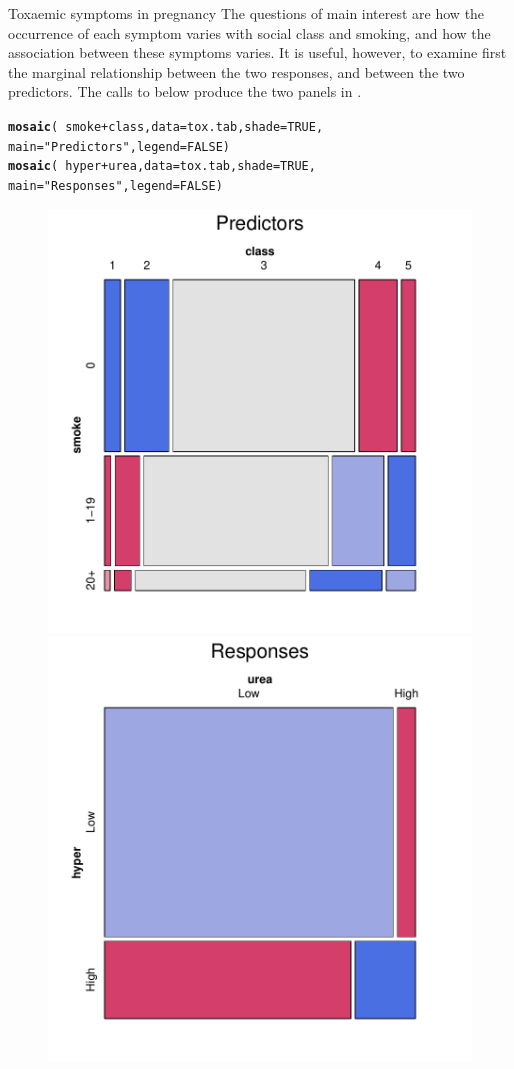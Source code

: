 \documentclass[11pt]{book}\usepackage[]{graphicx}\usepackage[]{color}
\makeatletter
\newcommand{\hlnum}[1]{\textcolor[rgb]{0.686,0.059,0.569}{#1}}%
\newcommand{\hlstr}[1]{\textcolor[rgb]{0.192,0.494,0.8}{#1}}%
\newcommand{\hlopt}[1]{\textcolor[rgb]{0,0,0}{#1}}%
\newcommand{\hlstd}[1]{\textcolor[rgb]{0.345,0.345,0.345}{#1}}%
\newcommand{\hlkwc}[1]{\textcolor[rgb]{0.333,0.667,0.333}{#1}}%
\newcommand{\hlkwd}[1]{\textcolor[rgb]{0.737,0.353,0.396}{\textbf{#1}}}%
\newenvironment{kframe}{%
 \def\at@end@of@kframe{}%
 \ifinner\ifhmode%
  \def\at@end@of@kframe{\end{minipage}}%
  \begin{minipage}{\columnwidth}%
 \fi\fi%
 \def\FrameCommand##1{\hskip\@totalleftmargin \hskip-\fboxsep
 \colorbox{shadecolor}{##1}\hskip-\fboxsep
     \hskip-\linewidth \hskip-\@totalleftmargin \hskip\columnwidth}%
 \MakeFramed {\advance\hsize-\width
   \@totalleftmargin\z@ \linewidth\hsize
   \@setminipage}}%
 {\par\unskip\endMakeFramed%
 \at@end@of@kframe}
\newenvironment{knitrout}{}{} %
\renewenvironment{knitrout}{\small\renewcommand{\baselinestretch}{.85}}{} %
\makeatother
\begin{document}
\begin{Example}[toxaemia]{Toxaemic symptoms in pregnancy}
The questions of main interest are how the occurrence of each symptom
varies with social class and smoking, and how the association between
these symptoms varies. It is useful, however, to examine first the marginal relationship between
the two responses, and between the two predictors.
The calls to  below produce the two panels in .

\begin{knitrout}
\color{fgcolor}\begin{kframe}
\begin{alltt}
\hlkwd{mosaic}\hlstd{(}\hlopt{~}\hlstd{smoke} \hlopt{+} \hlstd{class,} \hlkwc{data}\hlstd{=tox.tab,} \hlkwc{shade}\hlstd{=}\hlnum{TRUE}\hlstd{,}
       \hlkwc{main}\hlstd{=}\hlstr{"Predictors"}\hlstd{,} \hlkwc{legend}\hlstd{=}\hlnum{FALSE}\hlstd{)}
\hlkwd{mosaic}\hlstd{(}\hlopt{~}\hlstd{hyper} \hlopt{+} \hlstd{urea,} \hlkwc{data}\hlstd{=tox.tab,} \hlkwc{shade}\hlstd{=}\hlnum{TRUE}\hlstd{,}
       \hlkwc{main}\hlstd{=}\hlstr{"Responses"}\hlstd{,} \hlkwc{legend}\hlstd{=}\hlnum{FALSE}\hlstd{)}
\end{alltt}
\end{kframe}\begin{figure}[!htbp]


\centerline{\includegraphics[width=.5\textwidth]{ch08/fig/tox-mosaic1-1} 
\includegraphics[width=.5\textwidth]{ch08/fig/tox-mosaic1-2} }


\end{figure}
\end{knitrout}
\end{Example}
\end{document}
